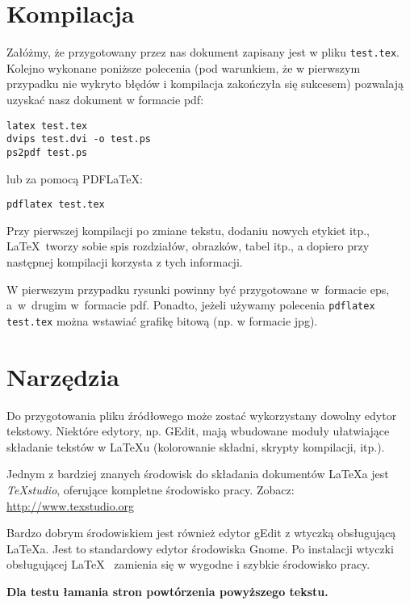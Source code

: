 \section{Kompilacja}
\label{sec:kompilacja}


Załóżmy, że przygotowany przez nas dokument zapisany jest w pliku \texttt{test.tex}. Kolejno wykonane poniższe polecenia (pod warunkiem, że w pierwszym przypadku nie wykryto błędów i kompilacja zakończyła się sukcesem) pozwalają uzyskać nasz dokument w formacie pdf:
\begin{lstlisting}
latex test.tex
dvips test.dvi -o test.ps
ps2pdf test.ps
\end{lstlisting}
%
lub za pomocą PDF\LaTeX:
\begin{lstlisting}
pdflatex test.tex
\end{lstlisting}

Przy pierwszej kompilacji po zmiane tekstu, dodaniu nowych etykiet itp., \LaTeX~tworzy sobie spis rozdziałów, obrazków, tabel itp., a dopiero przy następnej kompilacji korzysta z tych informacji.

W pierwszym przypadku rysunki powinny być przygotowane w~formacie eps, a~w~drugim w~formacie pdf. Ponadto, jeżeli używamy polecenia \texttt{pdflatex test.tex} można wstawiać grafikę bitową (np. w formacie jpg).




\section{Narzędzia}
\label{sec:narzedzia}


Do przygotowania pliku źródłowego może zostać wykorzystany dowolny edytor tekstowy. Niektóre edytory, np. GEdit, mają wbudowane moduły ułatwiające składanie tekstów w LaTeXu (kolorowanie składni, skrypty kompilacji, itp.).

Jednym z bardziej znanych środowisk do składania dokumentów  \LaTeX a jest {\em TeXstudio}, oferujące kompletne środowisko pracy. Zobacz: \url{http://www.texstudio.org}


Bardzo dobrym środowiskiem jest również edytor gEdit z wtyczką obsługującą \LaTeX a. Jest to standardowy edytor środowiska Gnome. Po instalacji wtyczki obsługującej \LaTeX~ zamienia się w wygodne i szybkie środowisko pracy.

\textbf{Dla testu łamania stron powtórzenia powyższego tekstu.}


